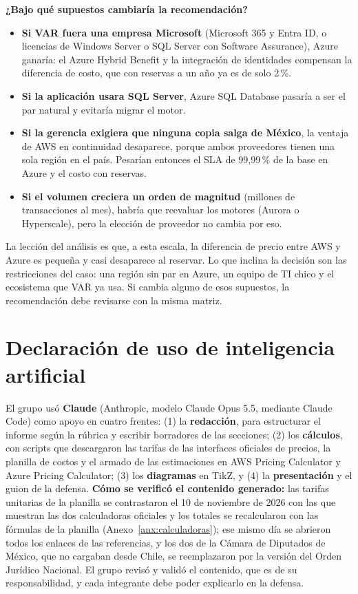 \documentclass[11pt,letterpaper]{article}
\begin{document}
\textbf{¿Bajo qué supuestos cambiaría la recomendación?}
\begin{itemize}
  \item \textbf{Si VAR fuera una empresa Microsoft} (Microsoft 365 y Entra ID, o licencias de Windows Server o SQL Server con Software Assurance), Azure ganaría: el Azure Hybrid Benefit y la integración de identidades compensan la diferencia de costo, que con reservas a un año ya es de solo 2\,\%.
  \item \textbf{Si la aplicación usara SQL Server}, Azure SQL Database pasaría a ser el par natural y evitaría migrar el motor.
  \item \textbf{Si la gerencia exigiera que ninguna copia salga de México}, la ventaja de AWS en continuidad desaparece, porque ambos proveedores tienen una sola región en el país. Pesarían entonces el SLA de 99,99\,\% de la base en Azure y el costo con reservas.
  \item \textbf{Si el volumen creciera un orden de magnitud} (millones de transacciones al mes), habría que reevaluar los motores (Aurora o Hyperscale), pero la elección de proveedor no cambia por eso.
\end{itemize}

\enlargethispage{2\baselineskip}
La lección del análisis es que, a esta escala, la diferencia de precio entre AWS y Azure es pequeña y casi desaparece al reservar. Lo que inclina la decisión son las restricciones del caso: una región sin par en Azure, un equipo de TI chico y el ecosistema que VAR ya usa. Si cambia alguno de esos supuestos, la recomendación debe revisarse con la misma matriz.

\section*{Declaración de uso de inteligencia artificial}
El grupo usó \textbf{Claude} (Anthropic, modelo Claude Opus 5.5, mediante Claude Code) como apoyo en cuatro frentes: (1) la \textbf{redacción}, para estructurar el informe según la rúbrica y escribir borradores de las secciones; (2) los \textbf{cálculos}, con scripts que descargaron las tarifas de las interfaces oficiales de precios, la planilla de costos y el armado de las estimaciones en AWS Pricing Calculator y Azure Pricing Calculator; (3) los \textbf{diagramas} en TikZ, y (4) la \textbf{presentación} y el guion de la defensa. \textbf{Cómo se verificó el contenido generado:} las tarifas unitarias de la planilla se contrastaron el 10 de noviembre de 2026 con las que muestran las dos calculadoras oficiales y los totales se recalcularon con las fórmulas de la planilla (Anexo~\ref{anx:calculadoras}); ese mismo día se abrieron todos los enlaces de las referencias, y los dos de la Cámara de Diputados de México, que no cargaban desde Chile, se reemplazaron por la versión del Orden Jurídico Nacional. El grupo revisó y validó el contenido, que es de su responsabilidad, y cada integrante debe poder explicarlo en la defensa.
\end{document}
